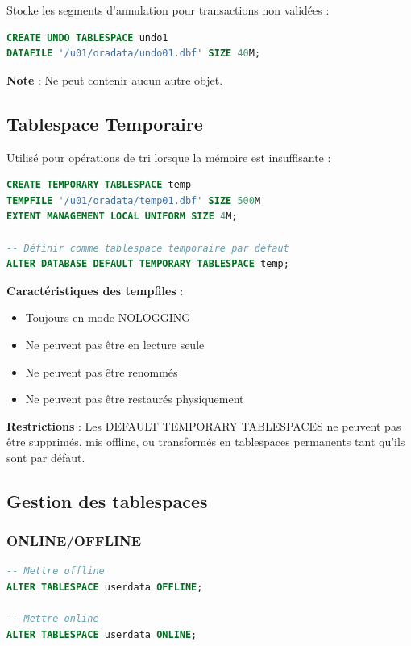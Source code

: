 \documentclass[12pt,a4paper]{article}
\begin{document}
Stocke les segments d'annulation pour transactions non validées :
\begin{lstlisting}[language=SQL]
CREATE UNDO TABLESPACE undo1
DATAFILE '/u01/oradata/undo01.dbf' SIZE 40M;
\end{lstlisting}

\textbf{Note} : Ne peut contenir aucun autre objet.

\subsection{Tablespace Temporaire}

Utilisé pour opérations de tri lorsque la mémoire est insuffisante :
\begin{lstlisting}[language=SQL]
CREATE TEMPORARY TABLESPACE temp
TEMPFILE '/u01/oradata/temp01.dbf' SIZE 500M
EXTENT MANAGEMENT LOCAL UNIFORM SIZE 4M;

-- Définir comme tablespace temporaire par défaut
ALTER DATABASE DEFAULT TEMPORARY TABLESPACE temp;
\end{lstlisting}

\textbf{Caractéristiques des tempfiles} :
\begin{itemize}
    \item Toujours en mode NOLOGGING
    \item Ne peuvent pas être en lecture seule
    \item Ne peuvent pas être renommés
    \item Ne peuvent pas être restaurés physiquement
\end{itemize}

\textbf{Restrictions} : Les DEFAULT TEMPORARY TABLESPACES ne peuvent pas être supprimés, mis offline, ou transformés en tablespaces permanents tant qu'ils sont par défaut.

\subsection{Gestion des tablespaces}

\subsubsection{ONLINE/OFFLINE}

\begin{lstlisting}[language=SQL]
-- Mettre offline
ALTER TABLESPACE userdata OFFLINE;

-- Mettre online
ALTER TABLESPACE userdata ONLINE;
\end{lstlisting}
\end{document}
